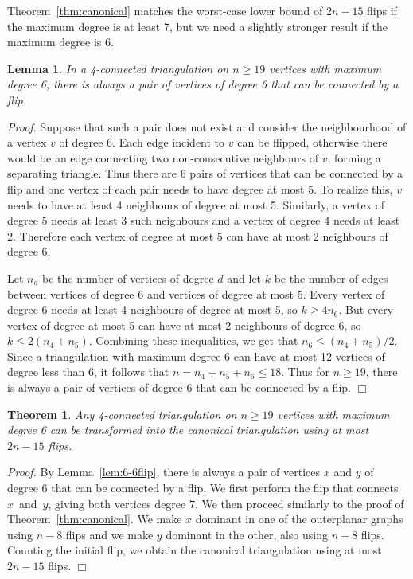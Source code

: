 \pdfoutput=1 \documentclass[12pt]{elsarticle}
\newtheorem{theo}[defin]{Theorem}
\newenvironment{theorem}{\begin{theo} \sl}{\end{theo}}
\newtheorem{lem}[defin]{Lemma}
\newenvironment{lemma}{\begin{lem} \sl}{\end{lem}}
\newenvironment{proof}{\emph{Proof.}}{\hfill $\Box$ \medskip\\}
\begin{document}
\noindent Theorem~\ref{thm:canonical} matches the worst-case lower bound of $2n - 15$ flips if the maximum degree is at least 7, but we need a slightly stronger result if the maximum degree is 6.

\begin{lemma}
 \label{lem:6-6flip}
 In a 4-connected triangulation on $n \geq 19$ vertices with maximum degree 6, there is always a pair of vertices of degree 6 that can be connected by a flip.
\end{lemma}
\begin{proof}
 Suppose that such a pair does not exist and consider the neighbourhood of a vertex $v$ of degree 6. Each edge incident to $v$ can be flipped, otherwise there would be an edge connecting two non-consecutive neighbours of $v$, forming a separating triangle. Thus there are 6 pairs of vertices that can be connected by a flip and one vertex of each pair needs to have degree at most 5. To realize this, $v$ needs to have at least 4 neighbours of degree at most 5. Similarly, a vertex of degree 5 needs at least 3 such neighbours and a vertex of degree 4 needs at least 2. Therefore each vertex of degree at most 5 can have at most 2 neighbours of degree 6.

 Let $n_d$ be the number of vertices of degree $d$ and let $k$ be the number of edges between vertices of degree 6 and vertices of degree at most 5. Every vertex of degree 6 needs at least 4 neighbours of degree at most 5, so $k \geq 4 n_6$. But every vertex of degree at most 5 can have at most 2 neighbours of degree 6, so $k \leq 2 (n_4 + n_5)$. Combining these inequalities, we get that $n_6 \leq (n_4 + n_5)/2$. Since a triangulation with maximum degree 6 can have at most 12 vertices of degree less than 6, it follows that $n = n_4 + n_5 + n_6 \leq 18$. Thus for $n \geq 19$, there is always a pair of vertices of degree 6 that can be connected by a flip.
\end{proof}

\begin{theorem}
\label{thm:canonicalmaxdeg6}
Any 4-connected triangulation on $n \geq 19$ vertices with maximum degree 6 can be transformed into the canonical triangulation using at most $2n - 15$ flips.
\end{theorem}
\begin{proof}
By Lemma~\ref{lem:6-6flip}, there is always a pair of vertices $x$ and $y$ of degree 6 that can be connected by a flip. We first perform the flip that connects \mbox{$x$ and $y$}, giving both vertices degree 7. We then proceed similarly to the proof of Theorem~\ref{thm:canonical}. We make $x$ dominant in one of the outerplanar graphs using $n - 8$ flips and we make $y$ dominant in the other, also using $n - 8$ flips. Counting the initial flip, we obtain the canonical triangulation using at most $2n - 15$ flips.
\end{proof}
\end{document}
